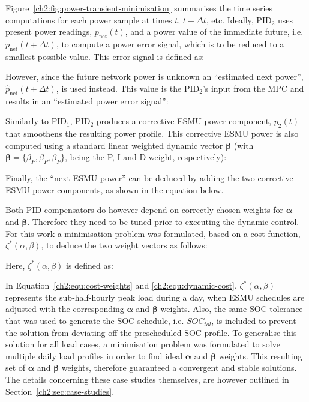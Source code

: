 

Figure~\ref{ch2:fig:power-transient-minimisation} summarises the time series computations for each power sample at times $t$, $t+\Delta t$, etc.
Ideally, PID$_2$ uses present power readings, $p_\text{net}(t)$, and a power value of the immediate future, i.e. $p_\text{net}(t+\Delta t)$, to compute a power error signal, which is to be reduced to a smallest possible value.
This error signal is defined as:



However, since the future network power is unknown an ``estimated next power'', $\hat{p}_\text{net}(t+\Delta t)$, is used instead.
This value is the PID$_2$'s input from the MPC and results in an ``estimated power error signal'':



Similarly to PID$_1$, PID$_2$ produces a corrective ESMU power component, $p_2(t)$ that smoothens the resulting power profile.
This corrective ESMU power is also computed using a standard linear weighted dynamic vector $\boldsymbol{\beta}$ (with $\boldsymbol{\beta} = \{\beta_P, \beta_P, \beta_P\}$, being the P, I and D weight, respectively):



Finally, the ``next ESMU power'' can be deduced by adding the two corrective ESMU power components, as shown in the equation below.



Both PID compensators do however depend on correctly chosen weights for $\boldsymbol{\alpha}$ and $\boldsymbol{\beta}$.
Therefore they need to be tuned prior to executing the dynamic control.
For this work a minimisation problem was formulated, based on a cost function, $\zeta^*(\alpha, \beta)$, to deduce the two weight vectors as follows:



Here, $\zeta^*(\alpha, \beta)$ is defined as:



In Equation~\ref{ch2:equ:cost-weights} and \ref{ch2:equ:dynamic-cost}, $\zeta^*(\alpha, \beta)$ represents the sub-half-hourly peak load during a day, when ESMU schedules are adjusted with the corresponding $\boldsymbol{\alpha}$ and $\boldsymbol{\beta}$ weights.
Also, the same SOC tolerance that was used to generate the SOC schedule, i.e. $SOC_{tol}$, is included to prevent the solution from deviating off the prescheduled SOC profile.
To generalise this solution for all load cases, a minimisation problem was formulated to solve multiple daily load profiles in order to find ideal $\boldsymbol{\alpha}$ and $\boldsymbol{\beta}$ weights.
This resulting set of $\boldsymbol{\alpha}$ and $\boldsymbol{\beta}$ weights, therefore guaranteed a convergent and stable solutions.
The details concerning these case studies themselves, are however outlined in Section~\ref{ch2:sec:case-studies}.

